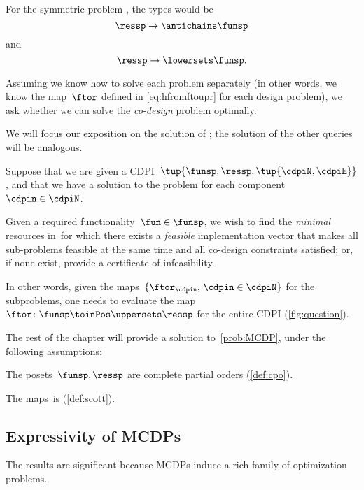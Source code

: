 For the symmetric problem \FixResMaxFun, the types would be
\begin{equation}
    \ressp \to \antichains\funsp
\end{equation}
and
\begin{equation}
    \ressp \to \lowersets\funsp.
\end{equation}


Assuming we know how to solve each problem separately (in other words, we know the map~$\ftor$ defined in \cref{eq:hfromftoupr} for each design problem), we ask whether we can solve
the \emph{co-design} problem optimally.

We will focus our exposition on the solution of \FixFunMinRes; the solution of the other queries will be analogous.


\begin{problem}
    \label{prob:MCDP}
    Suppose that we are given a CDPI~$\tup{ \funsp,\ressp,\tup{ \cdpiN,\cdpiE} }$, and
    that we have a solution to the \FixFunMinRes problem for each component~$\cdpin\in\cdpiN$.

    Given a required functionality~$\fun\in\funsp$, we wish to find
    the \emph{minimal} resources in~\ressp for which there exists
    a \emph{feasible} implementation vector that makes all sub-problems feasible
    at the same time and all co-design constraints satisfied; or, if
    none exist, provide a certificate of infeasibility.
\end{problem}
In other words, given the maps~$\{\ftor_{\cdpin},\,\cdpin\in\cdpiN\}$
for the subproblems, one needs to evaluate  the map~$\ftor\colon\funsp \toinPos \uppersets \ressp$
for the entire CDPI (\cref{fig:question}).


The rest of the chapter will provide a solution to~\cref{prob:MCDP},
under the following assumptions:

\begin{compactenum}
    \item The posets~$\funsp,\ressp$ are complete partial orders (\cref{def:cpo}).
    \item The maps~\ftor is \scottcontinuous (\cref{def:scott}).
\end{compactenum}

\subsection{Expressivity of MCDPs}
The results are significant because MCDPs induce a rich family of
optimization problems.


